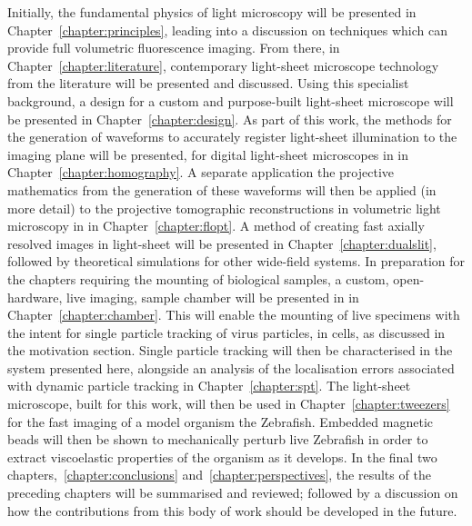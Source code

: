 Initially, the fundamental physics of light microscopy will be presented in Chapter~\ref{chapter:principles}, leading into a discussion on techniques which can provide full volumetric fluorescence imaging.
From there, in Chapter~\ref{chapter:literature}, contemporary light-sheet microscope technology from the literature will be presented and discussed.
Using this specialist background, a design for a custom and purpose-built light-sheet microscope will be presented in Chapter~\ref{chapter:design}.
As part of this work, the methods for the generation of waveforms to accurately register light-sheet illumination to the imaging plane will be presented, for digital light-sheet microscopes in in Chapter~\ref{chapter:homography}.
A separate application the projective mathematics from the generation of these waveforms will then be applied (in more detail) to the projective tomographic reconstructions in volumetric light microscopy in in Chapter~\ref{chapter:flopt}.
A method of creating fast axially resolved images in light-sheet will be presented in Chapter~\ref{chapter:dualslit}, followed by theoretical simulations for other wide-field systems.
In preparation for the chapters requiring the mounting of biological samples, a custom, open-hardware, live imaging, sample chamber will be presented in in Chapter~\ref{chapter:chamber}.
This will enable the mounting of live specimens with the intent for single particle tracking of virus particles, in cells, as discussed in the motivation section.
Single particle tracking will then be characterised in the system presented here, alongside an analysis of the localisation errors associated with dynamic particle tracking in Chapter~\ref{chapter:spt}.
The light-sheet microscope, built for this work, will then be used in Chapter~\ref{chapter:tweezers} for the fast imaging of a model organism the Zebrafish.
Embedded magnetic beads will then be shown to mechanically perturb live Zebrafish in order to extract viscoelastic properties of the organism as it develops.
In the final two chapters,~\ref{chapter:conclusions} and~\ref{chapter:perspectives}, the results of the preceding chapters will be summarised and reviewed; followed by a discussion on how the contributions from this body of work should be developed in the future.
